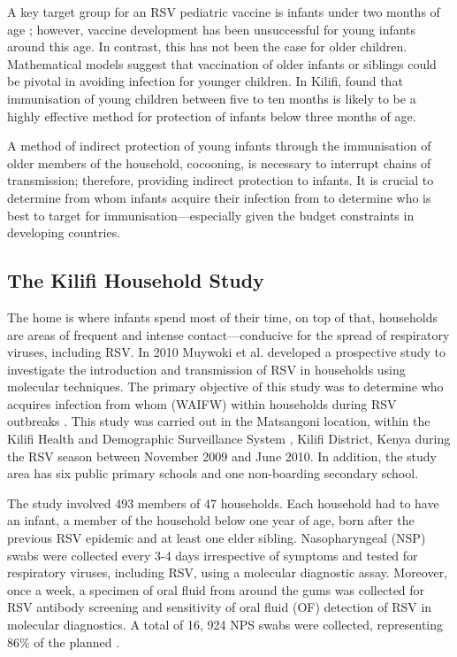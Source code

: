 \documentclass[10pt, a4paper]{article}
\begin{document}
A key target group for an RSV pediatric vaccine is infants under two months of
age \cite{nokesNewStrategiesControl2008}; however, vaccine development has been
unsuccessful for young infants around this age.
In contrast, this has not been the case for older children. Mathematical models
\cite{whiteTransmissionDynamicsGroups2005,whiteUnderstandingTransmissionDynamics2007}
suggest that vaccination of older infants or siblings
could be pivotal in avoiding infection for younger children.
In Kilifi, \cite{kinyanjuiVaccineInducedHerd2015,munywokiInfluenceAgeSeverity2015}
found that immunisation of young children between five to ten months is likely
to be a highly effective method for protection of infants below three months of
age.

A method of indirect protection of young infants through the immunisation of
older members of the household, cocooning, is necessary to interrupt chains of
transmission; therefore, providing indirect protection to infants.
It is crucial to determine from whom infants acquire their infection from to
determine who is best to target for immunisation—especially given the budget
constraints in developing countries.

\newpage

\subsection{The Kilifi Household Study}
\label{sec:org958cee9}
The home is where infants spend most of their time, on top of that, households
are areas of frequent and intense contact—conducive for the spread of
respiratory viruses, including RSV. In 2010 Muywoki et al. developed a
prospective study to investigate the introduction and transmission of RSV in
households using molecular techniques. The primary objective of this study was
to determine who acquires infection from whom (WAIFW) within households during
RSV outbreaks \cite{munywokiTransmissionRespiratorySyncytial2013}.
This study was carried out in the Matsangoni location, within the Kilifi Health
and Demographic Surveillance System \cite{scottProfileKilifiHealth2012},
Kilifi District, Kenya during the RSV season between November 2009 and
June 2010. In addition, the study area has six public primary schools and one
non-boarding secondary school.

The study involved 493 members of 47 households. Each household had to have an
infant, a member of the household below one year of age, born after the previous
RSV epidemic and at least one elder sibling. Nasopharyngeal (NSP) swabs were
collected every 3-4 days irrespective of symptoms and tested for respiratory
viruses, including RSV, using a molecular diagnostic assay. Moreover, once a
week, a specimen of oral fluid from around the gums was collected for RSV
antibody screening and sensitivity of oral fluid (OF) detection of RSV in
molecular diagnostics.
A total of 16, 924 NPS swabs were collected, representing 86\% of the planned
\cite{munywokiTransmissionRespiratorySyncytial2013}.
\end{document}
